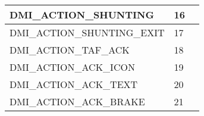 \documentclass{template/openetcs_article}
\begin{document}
\begin{longtable}{|l|l|l|}
		\begin{minipage}[t]{0.60\linewidth}	DMI\_ACTION\_SHUNTING\end{minipage}
	&	\begin{minipage}[t]{0.15\linewidth} 16 	\end{minipage}
	&	\begin{minipage}[t]{0.30\linewidth} \end{minipage}\\
		\hline
		\begin{minipage}[t]{0.60\linewidth}	DMI\_ACTION\_SHUNTING\_EXIT\end{minipage}
	&	\begin{minipage}[t]{0.15\linewidth} 17 	\end{minipage}
	&	\begin{minipage}[t]{0.30\linewidth} \end{minipage}\\
		\hline
		\begin{minipage}[t]{0.60\linewidth}	DMI\_ACTION\_TAF\_ACK\end{minipage}
	&	\begin{minipage}[t]{0.15\linewidth} 18 	\end{minipage}
	&	\begin{minipage}[t]{0.30\linewidth} \end{minipage}\\
		\hline
		\begin{minipage}[t]{0.60\linewidth}	DMI\_ACTION\_ACK\_ICON\end{minipage}
	&	\begin{minipage}[t]{0.15\linewidth} 19 	\end{minipage}
	&	\begin{minipage}[t]{0.30\linewidth} \end{minipage}\\
		\hline
		\begin{minipage}[t]{0.60\linewidth}	DMI\_ACTION\_ACK\_TEXT\end{minipage}
	&	\begin{minipage}[t]{0.15\linewidth} 20 	\end{minipage}
	&	\begin{minipage}[t]{0.30\linewidth} \end{minipage}\\
	\hline
		\begin{minipage}[t]{0.60\linewidth}	DMI\_ACTION\_ACK\_BRAKE\end{minipage}
	&	\begin{minipage}[t]{0.15\linewidth} 21 	\end{minipage}
	&	\begin{minipage}[t]{0.30\linewidth} \end{minipage}\\
		\hline
\end{longtable}
\end{document}

